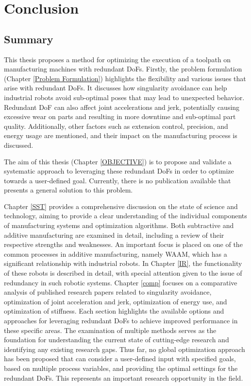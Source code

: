 \chapter{Conclusion}%
\section{Summary}%
This thesis proposes a method for optimizing the execution of a toolpath on manufacturing machines with redundant \acrshort{DoF}s. Firstly, the problem formulation (Chapter \ref{Problem Formulation}) highlights the flexibility and various issues that arise with redundant \acrshort{DoF}s. It discusses how singularity avoidance can help industrial robots avoid sub-optimal poses that may lead to unexpected behavior. Redundant \acrshort{DoF} can also affect joint accelerations and jerk, potentially causing excessive wear on parts and resulting in more downtime and sub-optimal part quality. Additionally, other factors such as extension control, precision, and energy usage are mentioned, and their impact on the manufacturing process is discussed.

The aim of this thesis (Chapter \ref{OBJECTIVE}) is to propose and validate a systematic approach to leveraging these redundant \acrshort{DoF}s in order to optimize towards a user-defined goal. Currently, there is no publication available that presents a general solution to this problem.


Chapter \ref{SST} provides a comprehensive discussion on the state of science and technology, aiming to provide a clear understanding of the individual components of manufacturing systems and optimization algorithms. Both subtractive and additive manufacturing are examined in detail, including a review of their respective strengths and weaknesses. An important focus is placed on one of the common processes in additive manufacturing, namely \acrshort{WAAM}, which has a significant relationship with industrial robots. In Chapter \ref{IR}, the functionality of these robots is described in detail, with special attention given to the issue of redundancy in such robotic systems. Chapter \ref{comp} focuses on a comparative analysis of published research papers related to singularity avoidance, optimization of joint acceleration and jerk, optimization of energy use, and optimization of stiffness. Each section highlights the available options and approaches for leveraging redundant \acrshort{DoF}s to achieve improved performance in these specific areas. The examination of multiple methods serves as the foundation for understanding the current state of cutting-edge research and identifying any existing research gaps.
Thus far, no global optimization approach has been proposed that can consider a user-defined input with specified goals, based on multiple process variables, and providing the optimal settings for the redundant \acrshort{DoF}s. This represents an important research opportunity in the field.

